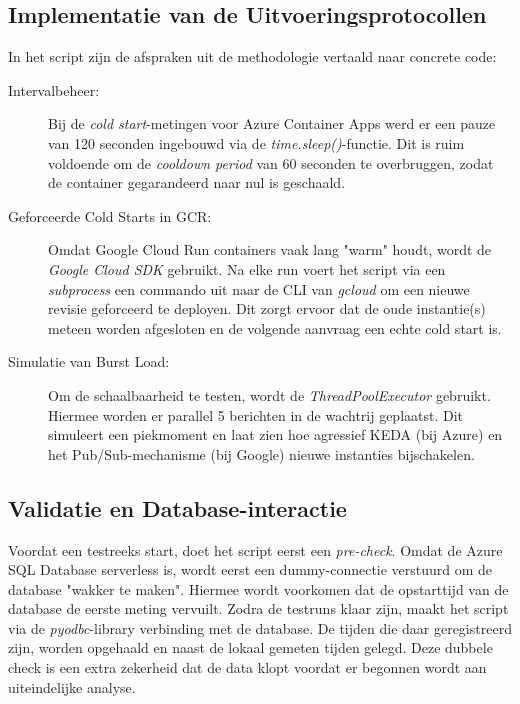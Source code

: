 \subsection{Implementatie van de Uitvoeringsprotocollen}

In het script zijn de afspraken uit de methodologie vertaald naar concrete code:

\begin{description}
    \item [Intervalbeheer:] Bij de \textit{cold start}-metingen voor Azure Container Apps werd er een pauze van 120 seconden ingebouwd via de \textit{time.sleep()}-functie. Dit is ruim voldoende om de \textit{cooldown period} van 60 seconden te overbruggen, zodat de container gegarandeerd naar nul is geschaald.
    \item [Geforceerde Cold Starts in GCR:] Omdat Google Cloud Run containers vaak lang "warm" houdt, wordt de \textit{Google Cloud SDK} gebruikt. Na elke run voert het script via een \textit{subprocess} een commando uit naar de CLI van \textit{gcloud} om een nieuwe revisie geforceerd te deployen. Dit zorgt ervoor dat de oude instantie(s) meteen worden afgesloten en de volgende aanvraag een echte cold start is.
    \item [Simulatie van Burst Load:] Om de schaalbaarheid te testen, wordt de \textit{ThreadPoolExecutor} gebruikt. Hiermee worden er parallel 5 berichten in de wachtrij geplaatst. Dit simuleert een piekmoment en laat zien hoe agressief KEDA (bij Azure) en het Pub/Sub-mechanisme (bij Google) nieuwe instanties bijschakelen.
\end{description}


\subsection{Validatie en Database-interactie}

Voordat een testreeks start, doet het script eerst een \textit{pre-check}. Omdat de Azure SQL Database serverless is, wordt eerst een dummy-connectie verstuurd om de database "wakker te maken". Hiermee wordt voorkomen dat de opstarttijd van de database de eerste meting vervuilt. Zodra de testruns klaar zijn, maakt het script via de \textit{pyodbc}-library verbinding met de database. De tijden die daar geregistreerd zijn, worden opgehaald en naast de lokaal gemeten tijden gelegd. Deze dubbele check is een extra zekerheid dat de data klopt voordat er begonnen wordt aan uiteindelijke analyse.
